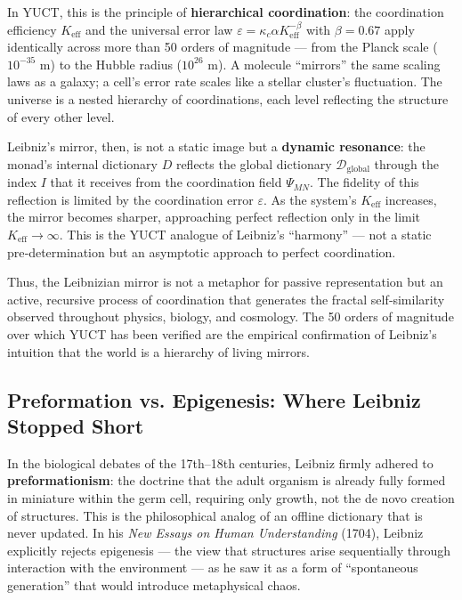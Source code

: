\documentclass[12pt,a4paper]{article}
\begin{document}
	In YUCT, this is the principle of \textbf{hierarchical coordination}: the coordination efficiency \(K_{\mathrm{eff}}\) and the universal error law \(\varepsilon = \kappa_c \alpha K_{\mathrm{eff}}^{-\beta}\) with \(\beta=0.67\) apply identically across more than 50 orders of magnitude — from the Planck scale (\(10^{-35}\) m) to the Hubble radius (\(10^{26}\) m). A molecule “mirrors” the same scaling laws as a galaxy; a cell’s error rate scales like a stellar cluster’s fluctuation. The universe is a nested hierarchy of coordinations, each level reflecting the structure of every other level.
	
	Leibniz’s mirror, then, is not a static image but a \textbf{dynamic resonance}: the monad’s internal dictionary \(D\) reflects the global dictionary \(\mathcal{D}_{\text{global}}\) through the index \(I\) that it receives from the coordination field \(\Psi_{MN}\). The fidelity of this reflection is limited by the coordination error \(\varepsilon\). As the system’s \(K_{\mathrm{eff}}\) increases, the mirror becomes sharper, approaching perfect reflection only in the limit \(K_{\mathrm{eff}} \to \infty\). This is the YUCT analogue of Leibniz’s “harmony” — not a static pre‑determination but an asymptotic approach to perfect coordination.
	
	Thus, the Leibnizian mirror is not a metaphor for passive representation but an active, recursive process of coordination that generates the fractal self‑similarity observed throughout physics, biology, and cosmology. The 50 orders of magnitude over which YUCT has been verified are the empirical confirmation of Leibniz’s intuition that the world is a hierarchy of living mirrors.
	
	\subsection{Preformation vs. Epigenesis: Where Leibniz Stopped Short}
	
	In the biological debates of the 17th–18th centuries, Leibniz firmly adhered to \textbf{preformationism}: the doctrine that the adult organism is already fully formed in miniature within the germ cell, requiring only growth, not the de novo creation of structures. This is the philosophical analog of an offline dictionary that is never updated. In his \emph{New Essays on Human Understanding} (1704), Leibniz explicitly rejects epigenesis — the view that structures arise sequentially through interaction with the environment — as he saw it as a form of “spontaneous generation” that would introduce metaphysical chaos.
	
\end{document}

